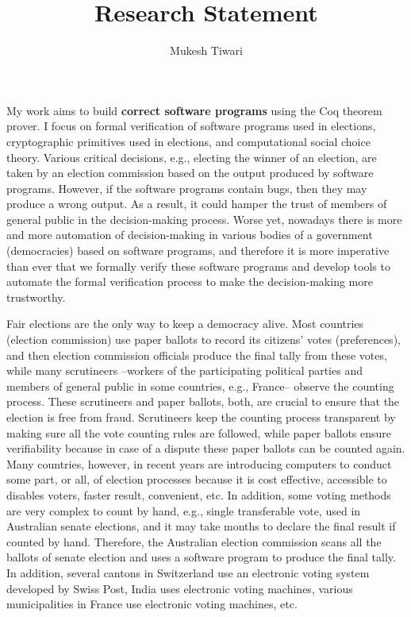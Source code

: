 \documentclass[a4paper]{article}
\title{Research Statement}
\author{Mukesh Tiwari}
\date{}
\begin{document}
\fontsize{12}{15}
\selectfont
\maketitle

My work aims to build \textbf{correct software programs} 
using the Coq theorem prover. 
I focus on formal verification of software programs used in elections, 
cryptographic primitives used in elections, and computational social choice theory.  
Various critical decisions, e.g., electing the winner of an election, 
are taken by an election commission based on the output produced by software programs. 
However, if the
software programs contain bugs, then they may produce a wrong 
output. As a result, it could hamper the trust of  
members of general public in the decision-making process.
Worse yet, nowadays there is more and more automation of decision-making 
in various bodies of a government (democracies) based on software programs, 
and therefore it is more imperative than ever  that  we formally verify these software programs and 
develop tools to automate the formal verification process to make the decision-making more trustworthy. 

Fair elections are the only way to keep a democracy alive. Most countries (election commission) use paper ballots to record 
its citizens' votes (preferences), and then election commission officials produce the final tally from these votes, 
while many scrutineers --workers of the participating political parties and members of general public in 
some countries, e.g., France--  
observe the counting process. These scrutineers and paper ballots, both, are crucial to ensure that 
the election is free from fraud. Scrutineers keep the counting process transparent by making sure all the vote counting 
rules are followed, while paper ballots ensure verifiability because in case of a dispute these paper ballots 
can be counted again. Many countries, however, in recent years are introducing computers to conduct some part, or all, of 
election processes because it is cost effective, accessible to disables voters, faster result, convenient, etc. 
In addition, some voting methods are very complex to count by hand, e.g., 
single transferable vote, used in Australian senate elections, and it may take months to declare the final result if 
counted by hand. Therefore, the Australian election commission scans all the ballots of senate election and 
uses a software program to produce the final tally. In addition, several cantons in Switzerland use an electronic 
voting system developed by Swiss Post, India uses electronic voting machines, various municipalities in France 
use electronic voting machines, etc.
\end{document}
